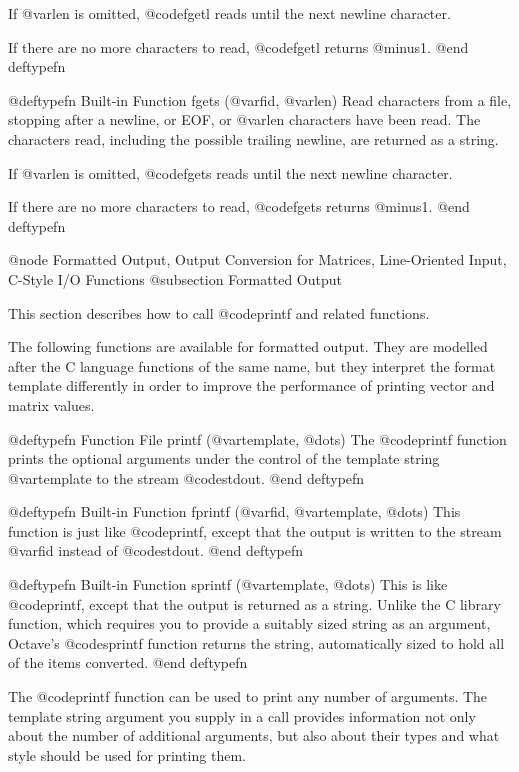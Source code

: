 If @var{len} is omitted, @code{fgetl} reads until the next newline
character.

If there are no more characters to read, @code{fgetl} returns @minus{}1.
@end deftypefn

@deftypefn {Built-in Function} {} fgets (@var{fid}, @var{len})
Read characters from a file, stopping after a newline, or EOF,
or @var{len} characters have been read.  The characters read, including
the possible trailing newline, are returned as a string.

If @var{len} is omitted, @code{fgets} reads until the next newline
character.

If there are no more characters to read, @code{fgets} returns @minus{}1.
@end deftypefn

@node Formatted Output, Output Conversion for Matrices, Line-Oriented Input, C-Style I/O Functions
@subsection Formatted Output

This section describes how to call @code{printf} and related functions.

The following functions are available for formatted output.  They are
modelled after the C language functions of the same name, but they
interpret the format template differently in order to improve the
performance of printing vector and matrix values.

@deftypefn {Function File} {} printf (@var{template}, @dots{})
The @code{printf} function prints the optional arguments under the
control of the template string @var{template} to the stream
@code{stdout}.
@end deftypefn

@deftypefn {Built-in Function} {} fprintf (@var{fid}, @var{template}, @dots{})
This function is just like @code{printf}, except that the output is
written to the stream @var{fid} instead of @code{stdout}.
@end deftypefn

@deftypefn {Built-in Function} {} sprintf (@var{template}, @dots{})
This is like @code{printf}, except that the output is returned as a
string.  Unlike the C library function, which requires you to provide a
suitably sized string as an argument, Octave's @code{sprintf} function
returns the string, automatically sized to hold all of the items
converted.
@end deftypefn

The @code{printf} function can be used to print any number of arguments.
The template string argument you supply in a call provides
information not only about the number of additional arguments, but also
about their types and what style should be used for printing them.

